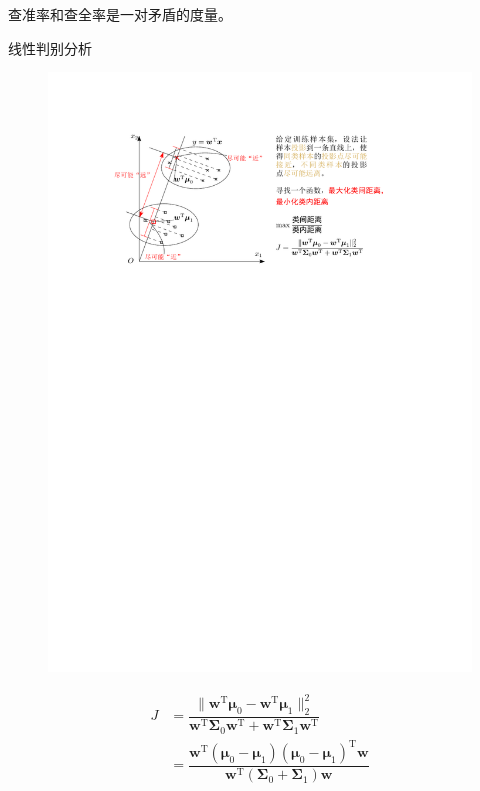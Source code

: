 \begin{itemize}
\begin{itemize}
        查准率和查全率是一对矛盾的度量。
    \end{itemize}
\end{itemize}

\textcolor{main1}{线性判别分析}
\begin{figure}[htbp]
    \centering
    \includegraphics{image/线性判别分析.pdf}
\end{figure}
\[
    \begin{array}{ll}
        J &= \dfrac{\| \boldsymbol{w}^{\mathrm{T}}\boldsymbol{\mu}_0 - \boldsymbol{w}^{\mathrm{T}}\boldsymbol{\mu}_1 \|_2^2}{ \boldsymbol{w}^{\mathrm{T}}\boldsymbol{\Sigma}_0\boldsymbol{w}^{\mathrm{T}} + \boldsymbol{w}^{\mathrm{T}}\boldsymbol{\Sigma}_1\boldsymbol{w}^{\mathrm{T}} }\\
        &=\dfrac{\boldsymbol{w}^{\mathrm{T}}\left( \boldsymbol{\mu}_0-\boldsymbol{\mu}_1 \right)\left( \boldsymbol{\mu}_0-\boldsymbol{\mu}_1 \right)^{\mathrm{T}}\boldsymbol{w}}{ \boldsymbol{w}^{\mathrm{T}}\left( \boldsymbol{\Sigma}_0 + \boldsymbol{\Sigma}_1 \right)\boldsymbol{w}}
    \end{array}
\]

